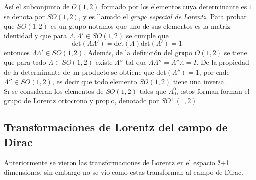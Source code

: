 Así el subconjunto de $O(1,2)$ formado por los elementos cuya determinante es $1$ se denota por $SO(1,2)$, y es llamado el \emph{grupo especial de Lorentz}. Para probar que $SO(1,2)$ es un grupo notamos que uno de sus elementos es la matriz identidad y que para $\Lambda, \Lambda' \in SO(1,2)$ se cumple que
\begin{equation}
	\text{det}(\Lambda\Lambda') = \text{det}(\Lambda)\text{det}(\Lambda') =1,
\end{equation}
entonces $\Lambda\Lambda' \in SO(1,2)$. Además, de la definición del grupo $O(1,2)$ se tiene que para todo $\Lambda \in SO(1,2)$ existe $\Lambda''$ tal que $\Lambda\Lambda'' = \Lambda''\Lambda=I$. De la propiedad de la determinante de un producto se obtiene que $\text{det}(\Lambda'') = 1$, por ende $\Lambda'' \in SO(1,2)$, es decir que todo elemento $SO(1,2)$ tiene una inversa.\\
Si se consideran los elementos de $SO(1,2)$ tales que $\Lambda_0^0$, estos forman forman el grupo de Lorentz ortocrono y propio, denotado por $SO^+(1,2)$
\subsection{Transformaciones de Lorentz del campo de Dirac}
Anteriormente se vieron las transformaciones de Lorentz en el espacio 2+1 dimensiones, sin embargo no se vio como estas transforman al campo de Dirac.

